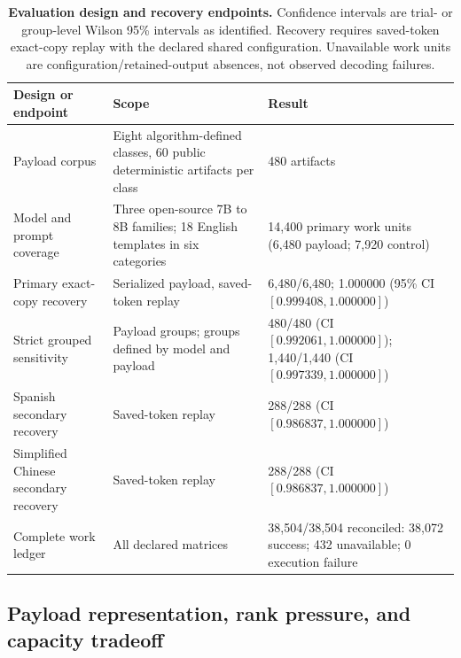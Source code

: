 \documentclass[fleqn,10pt]{wlscirep}
\begin{document}
\begin{table}[H]
\centering
\small
\begin{tabularx}{\textwidth}{L{0.25\textwidth}Y L{0.24\textwidth}}
\toprule
Design or endpoint & Scope & Result \\
\midrule
Payload corpus & Eight algorithm-defined classes, 60 public deterministic artifacts per class & 480 artifacts \\
Model and prompt coverage & Three open-source 7B to 8B families; 18 English templates in six categories & 14,400 primary work units (6,480 payload; 7,920 control) \\
Primary exact-copy recovery & Serialized payload, saved-token replay & 6,480/6,480; 1.000000 (95\% CI \([0.999408, 1.000000]\)) \\
Strict grouped sensitivity & Payload groups; groups defined by model and payload & 480/480 (CI \([0.992061, 1.000000]\)); 1,440/1,440 (CI \([0.997339, 1.000000]\)) \\
Spanish secondary recovery & Saved-token replay & 288/288 (CI \([0.986837, 1.000000]\)) \\
Simplified Chinese secondary recovery & Saved-token replay & 288/288 (CI \([0.986837, 1.000000]\)) \\
Complete work ledger & All declared matrices & 38,504/38,504 reconciled: 38,072 success; 432 unavailable; 0 execution failure \\
\bottomrule
\end{tabularx}
\caption{\label{tab:design-recovery}\textbf{Evaluation design and recovery endpoints.} Confidence intervals are trial- or group-level Wilson 95\% intervals as identified. Recovery requires saved-token exact-copy replay with the declared shared configuration. Unavailable work units are configuration/retained-output absences, not observed decoding failures.}
\end{table}

\subsection*{Payload representation, rank pressure, and capacity tradeoff}\label{sec:results-capacity}
\end{document}
